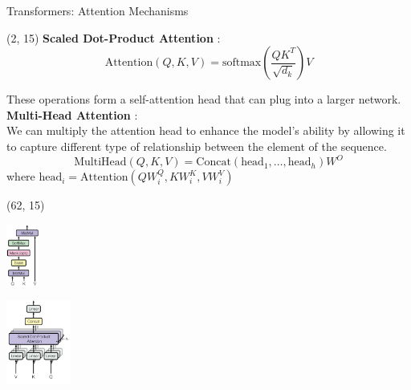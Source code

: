\begin{frame}{Transformers: Attention Mechanisms}
  \begin{textblock}{60}(2, 15)
    \textbf{Scaled Dot-Product Attention} : \\  
    
    \[
    \text{Attention}(Q, K, V) = \text{softmax}\left(\frac{QK^T}{\sqrt{d_k}}\right)V
    \]

    These operations form a self-attention head that can plug into a larger network.\\ 

    \textbf{Multi-Head Attention} : \\
    We can multiply the attention head to enhance the model's ability by allowing it to capture different type of relationship between the element of the sequence.
    \[
    \text{MultiHead}(Q, K, V) = \text{Concat}(\text{head}_1, \ldots, \text{head}_h)W^O
    \]
    where $\text{head}_i = \text{Attention}(QW_i^Q, KW_i^K, VW_i^V)$
  \end{textblock}

  \begin{textblock}{38}(62, 15)
    \begin{center}\includegraphics[width=40px]{img/transformer_10.png}\end{center}
    \begin{center}\includegraphics[width=80px]{img/transformer_11.png}\end{center}
  \end{textblock}

\end{frame}



